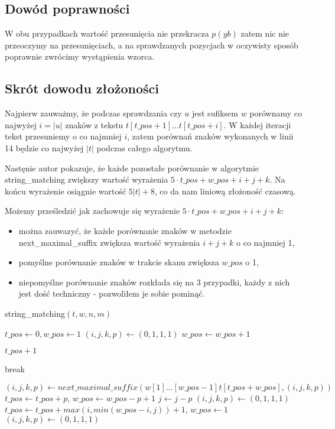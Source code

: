 \documentclass[a4paper,11pt]{article}
\theoremstyle{definition}
\begin{document}
\subsection{Dowód poprawności}
W obu przypadkach wartość przesunięcia nie przekracza $p(yb)$ zatem nic nie przeoczymy na przesunięciach, a na sprawdzanych pozycjach w oczywisty sposób poprawnie zwrócimy wystąpienia wzorca.

\subsection{Skrót dowodu złożoności}
Najpierw zauważmy, że podczas sprawdzania czy $u$ jest sufiksem $w$ porównamy co najwyżej $i = |u|$ znaków z tekstu $t[t\_pos + 1] \ldots t[t\_pos + i]$. W każdej iteracji tekst przesuniemy o co najmniej $i$, zatem porównań znaków wykonanych w linii 14 będzie co najwyżej $|t|$ podczas całego algorytmu. 

Nastęnie autor pokazuje, że każde pozostałe porównanie w algorytmie string\_matching zwiększy wartość wyrażenia $5 \cdot t\_pos + w\_pos + i + j + k$. Na końcu wyrażenie osiągnie wartość $5|t| + 8$, co da nam liniową złożoność czasową.

Możemy prześledzić jak zachowuje się wyrażenie $5 \cdot t\_pos + w\_pos + i + j + k$:
\begin{itemize}
    \item można zauwazyć, że każde porównanie znaków w metodzie next\_maximal\_suffix zwiększa wartość wyrażenia $i + j + k$ o co najmniej 1,
    \item pomyślne porównanie znaków w trakcie skanu zwiększa $w\_pos$ o 1,
    \item niepomyślne porównanie znaków rozkłada się na 3 przypadki, każdy z nich jest dość techniczny - pozwoliłem je sobie pominąć.
\end{itemize}

\begin{algorithm}[H]
\caption{string\_matching$(t, w, n, m)$}
\begin{algorithmic}[1]
\STATE $t\_pos \gets 0,  w\_pos \gets 1$
\STATE $(i,j,k,p) \gets (0,1,1,1)$
        \STATE $ w\_pos \gets  w\_pos + 1$
    \ENDWHILE
    
        \RETURN $t\_pos + 1$
    \ENDIF
    
        \STATE break
    \ENDIF
    
    \STATE $(i,j,k,p) \gets next\_maximal\_suffix(w[1] \ldots [ w\_pos-1]t[t\_pos +  w\_pos], (i, j, k, p))$
        \STATE $t\_pos \gets t\_pos + p$, $ w\_pos \gets  w\_pos - p + 1$
            \STATE $j \gets j - p$
        \ELSE
            \STATE $(i,j,k,p) \gets (0,1,1,1)$
        \ENDIF
    \ELSE
        \STATE $t\_pos \gets t\_pos + max(i, min( w\_pos - i, j)) + 1$, $ w\_pos \gets 1$
        \STATE $(i,j,k,p) \gets (0,1,1,1)$
    \ENDIF
\ENDWHILE

\end{algorithmic}
\end{algorithm}
\end{document}
